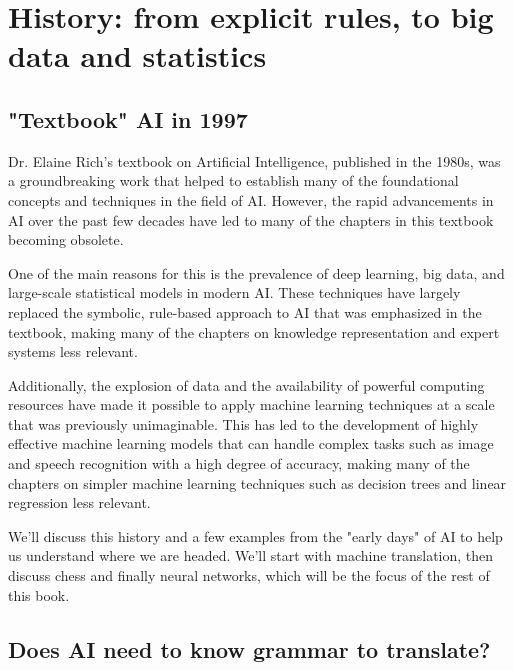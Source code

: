 \setchapterpreamble[u]{\margintoc}
\chapter{History: from explicit rules, to big data and statistics}

\section{"Textbook" AI in 1997}

Dr. Elaine Rich's textbook on Artificial Intelligence, published in the 1980s, was a groundbreaking work that helped to establish many of the foundational concepts and techniques in the field of AI. However, the rapid advancements in AI over the past few decades have led to many of the chapters in this textbook becoming obsolete.

One of the main reasons for this is the prevalence of deep learning, big data, and large-scale statistical models in modern AI. These techniques have largely replaced the symbolic, rule-based approach to AI that was emphasized in the textbook, making many of the chapters on knowledge representation and expert systems less relevant.

Additionally, the explosion of data and the availability of powerful computing resources have made it possible to apply machine learning techniques at a scale that was previously unimaginable. This has led to the development of highly effective machine learning models that can handle complex tasks such as image and speech recognition with a high degree of accuracy, making many of the chapters on simpler machine learning techniques such as decision trees and linear regression less relevant.  


We'll discuss this history and a few examples from the "early days" of AI to help us understand where we are headed. We'll start with machine translation, then discuss chess and finally neural networks, which will be the focus of the rest of this book.

\section{Does AI need to know grammar to translate?}

